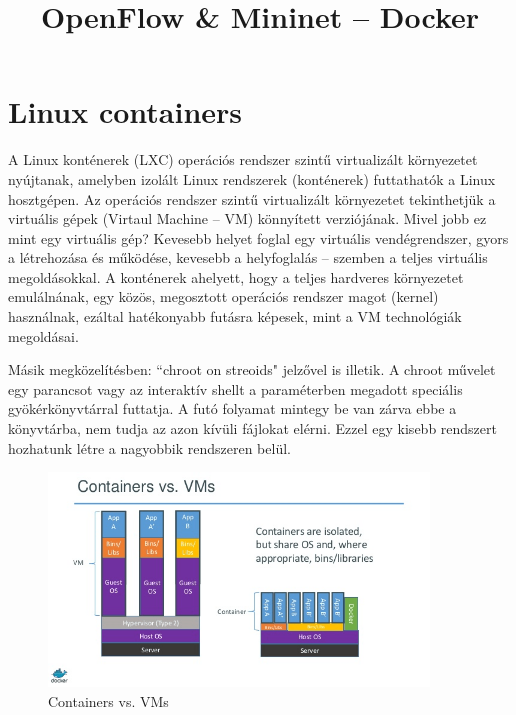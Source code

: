 \documentclass[a4paper]{article}
\title{OpenFlow \& Mininet – Docker}
\author{}
\date{}
\begin{document}
\maketitle

\tableofcontents

\section{Linux containers}
A Linux konténerek (LXC) operációs rendszer szintű virtualizált környezetet nyújtanak, amelyben izolált Linux rendszerek (konténerek) futtathatók a Linux hosztgépen. Az operációs rendszer szintű virtualizált környezetet tekinthetjük a virtuális gépek (Virtaul Machine – VM) könnyített verziójának. Mivel jobb ez mint egy virtuális gép? Kevesebb helyet foglal egy virtuális vendégrendszer, gyors a létrehozása és működése, kevesebb a helyfoglalás – szemben a teljes virtuális megoldásokkal. A konténerek ahelyett, hogy a teljes hardveres környezetet emulálnának, egy közös, megosztott operációs rendszer magot (kernel) használnak, ezáltal hatékonyabb futásra képesek, mint a VM technológiák megoldásai.

Másik megközelítésben: ``chroot on streoids" jelzővel is illetik. A chroot művelet egy parancsot vagy az interaktív shellt a paraméterben megadott speciális gyökérkönyvtárral futtatja. A futó folyamat mintegy be van zárva ebbe a könyvtárba, nem tudja az azon kívüli fájlokat elérni. Ezzel egy kisebb rendszert hozhatunk létre a nagyobbik rendszeren belül. 

\begin{figure}[H]
    \centering
    \includegraphics[width=0.9\textwidth]{figures/container_vs_vm.png}
    \caption{Containers vs. VMs}
    \label{fig:containers}
\end{figure}
\end{document}
